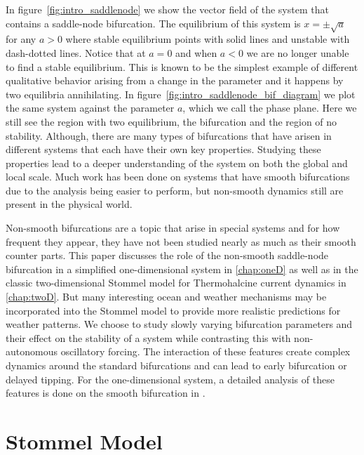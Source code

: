 In figure~\ref{fig:intro_saddlenode} we show the vector field of the system that contains a saddle-node bifurcation. The equilibrium of this system is $x=\pm \sqrt{a}$ for any $a>0$ where stable equilibrium points with solid lines and unstable with dash-dotted lines. Notice that at $a=0$ and when $a<0$ we are no longer unable to find a stable equilibrium. This is known to be the simplest example of different qualitative behavior arising from a change in the parameter and it happens by two equilibria annihilating. In figure~\ref{fig:intro_saddlenode_bif_diagram} we plot the same system against the parameter $a$, which we call the phase plane. Here we still see the region with two equilibrium, the bifurcation and the region of no stability. Although, there are many types of bifurcations that have arisen in different systems that each have their own key properties. Studying these properties lead to a deeper understanding of the system on both the global and local scale. Much work has been done on systems that have smooth bifurcations due to the analysis being easier to perform, but non-smooth dynamics still are present in the physical world.

Non-smooth bifurcations are a topic that arise in special systems and for how frequent they appear, they have not been studied nearly as much as their smooth counter parts. This paper discusses the role of the non-smooth saddle-node bifurcation in a simplified one-dimensional system in \autoref{chap:oneD} as well as in the classic two-dimensional Stommel model for Thermohalcine current dynamics in \autoref{chap:twoD}. But many interesting ocean and weather mechanisms may be incorporated into the Stommel model to provide more realistic predictions for weather patterns. We choose to study slowly varying bifurcation parameters and their effect on the stability of a system while contrasting this with non-autonomous oscillatory forcing. The interaction of these features create complex dynamics around the standard bifurcations and can lead to early bifurcation or delayed tipping. For the one-dimensional system, a detailed analysis of these features is done on the smooth bifurcation in \cite{zhu2015tipping}.

\section*{Stommel Model}

